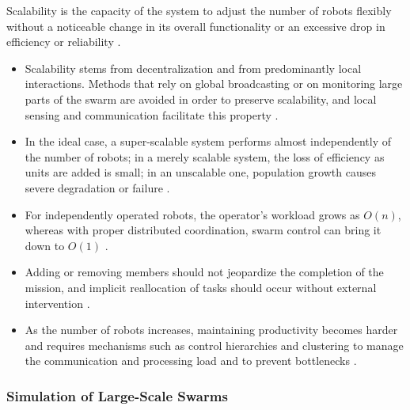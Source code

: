 Scalability is the capacity of the system to adjust the number of robots flexibly
without a noticeable change in its overall functionality or an excessive drop in
efficiency or reliability \cite{dias2021swarm,tan2013research}.
\begin{itemize}
  \item {} Scalability stems from decentralization and from
        predominantly local interactions. Methods that rely on global
        broadcasting or on monitoring large parts of the swarm are avoided in
        order to preserve scalability, and local sensing and communication
        facilitate this property \cite{brambilla2013swarm}.
  \item {} In the ideal case, a
        super-scalable system performs almost independently of the number of
        robots; in a merely scalable system, the loss of efficiency as units are
        added is small; in an unscalable one, population growth causes severe
        degradation or failure \cite{tan2013research}.
  \item {} For independently operated robots, the
        operator's workload grows as $O(n)$, whereas with proper distributed
        coordination, swarm control can bring it down to $O(1)$
        \cite{hart2004reducing,kolling2016human}.
  \item {} Adding or removing members should not jeopardize
        the completion of the mission, and implicit reallocation of tasks should
        occur without external intervention \cite{tan2013research}.
  \item {} As the number of robots increases, maintaining
        productivity becomes harder and requires mechanisms such as control
        hierarchies and clustering to manage the communication and processing
        load and to prevent bottlenecks \cite{bhowmick2024bio}.
\end{itemize}

\subsubsection{Simulation of Large-Scale Swarms}

